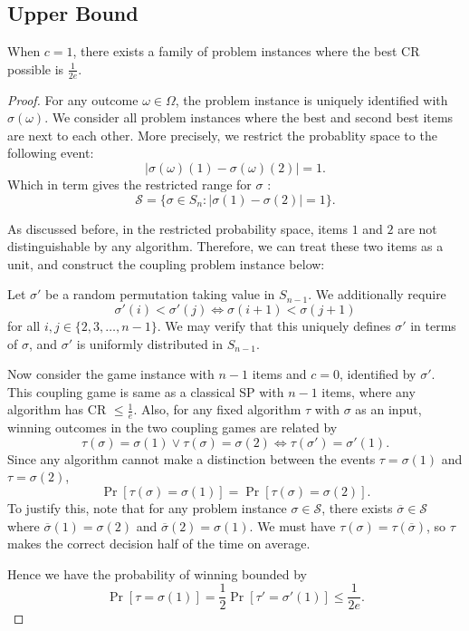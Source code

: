 
\subsection{Upper Bound}
\begin{theorem}
	When $c = 1$, there exists a family of problem instances where the best CR possible is $\frac{1}{2e}$.
\end{theorem}
\begin{proof}
	For any outcome $\omega \in \Omega$, the problem instance is uniquely identified with $\sigma(\omega)$. We consider all problem instances where the best and second best items are next to each other. More precisely, we restrict the probablity space to the following event: \[
		|\sigma(\omega)(1)-\sigma(\omega)(2)| = 1
	.\] 
	Which in term gives the restricted range for $\sigma$ :
	\[
		\mathcal{S} = \{\sigma \in S_n: |\sigma(1) - \sigma(2)| = 1\}
	.\]

	As discussed before, in the restricted probability space, items $1$ and $2$ are not distinguishable by any algorithm. Therefore, we can treat these two items as a unit, and construct the coupling problem instance below:

	Let $\sigma' $ be a random permutation taking value in $ S_{n-1}$. We additionally require
	\begin{equation*}
		\sigma'(i) < \sigma'(j) \iff \sigma(i+1)<\sigma(j+1)
	\end{equation*}
	for all $i, j \in \{2, 3, \ldots, n-1\} $. We may verify that this uniquely defines $\sigma'$ in terms of $\sigma$, and 
	$\sigma'$ is uniformly distributed in $S_{n - 1}$. 

	Now consider the game instance with $n -1$ items and $c = 0$, identified by $\sigma'$. This coupling game is same as a classical SP with $n - 1$ items, where any algorithm has CR $\le \frac{1}{e}$. Also, for any fixed algorithm $\tau$ with $\sigma$ as an input, winning outcomes in the two coupling games are related by
	\[
		 \tau(\sigma) = \sigma(1) \lor \tau(\sigma)=\sigma(2) \iff \tau(\sigma') = \sigma'(1) 
	.\]
	Since any algorithm cannot make a distinction between the events $\tau=\sigma(1)$ and $\tau = \sigma(2)$,
\[
	\operatorname{Pr} \left[ \tau(\sigma) = \sigma(1) \right] =
	\operatorname{Pr} \left[ \tau(\sigma) = \sigma(2) \right] 
.\] 
To justify this, note that for any problem instance $\sigma \in \mathcal{S}$, there exists $\overline{\sigma} \in \mathcal{S}$ where $\overline{\sigma} (1) = \sigma(2)$ and $\overline{\sigma} (2) = \sigma(1)$. We must have $\tau(\sigma) = \tau(\overline{\sigma} )$, so $\tau$ makes the correct decision half of the time on average.

	Hence we have the probability of winning bounded by
	\[
		\operatorname{Pr} \left[ \tau = \sigma(1) \right]  = \frac{1}{2}\operatorname{Pr} \left[ \tau' = \sigma'(1) \right]  \le  \frac{1}{2e}
	.\] 
\end{proof}

